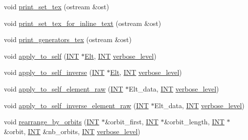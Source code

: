 \begin{DoxyCompactItemize}
void \mbox{\hyperlink{classset__and__stabilizer_a691a961365c213993a7f9f4b899457d9}{print\+\_\+set\+\_\+tex}} (ostream \&ost)
\item 
void \mbox{\hyperlink{classset__and__stabilizer_abded22948be28aa60b8ef9942d7b8198}{print\+\_\+set\+\_\+tex\+\_\+for\+\_\+inline\+\_\+text}} (ostream \&ost)
\item 
void \mbox{\hyperlink{classset__and__stabilizer_acbaae72aef6863f689fa377652cadb3e}{print\+\_\+generators\+\_\+tex}} (ostream \&ost)
\item 
void \mbox{\hyperlink{classset__and__stabilizer_a5d98982a4367ca2866d91da9ff48f095}{apply\+\_\+to\+\_\+self}} (\mbox{\hyperlink{galois_8h_a09fddde158a3a20bd2dcadb609de11dc}{I\+NT}} $\ast$\mbox{\hyperlink{simeon_8_c_aec1406935bdb1fee3561fcb840964100}{Elt}}, \mbox{\hyperlink{galois_8h_a09fddde158a3a20bd2dcadb609de11dc}{I\+NT}} \mbox{\hyperlink{simeon_8_c_a818073fbcc2f439e7c56952f67386122}{verbose\+\_\+level}})
\item 
void \mbox{\hyperlink{classset__and__stabilizer_a6e18b805c0f6dfe0c8dd9762411d9e41}{apply\+\_\+to\+\_\+self\+\_\+inverse}} (\mbox{\hyperlink{galois_8h_a09fddde158a3a20bd2dcadb609de11dc}{I\+NT}} $\ast$\mbox{\hyperlink{simeon_8_c_aec1406935bdb1fee3561fcb840964100}{Elt}}, \mbox{\hyperlink{galois_8h_a09fddde158a3a20bd2dcadb609de11dc}{I\+NT}} \mbox{\hyperlink{simeon_8_c_a818073fbcc2f439e7c56952f67386122}{verbose\+\_\+level}})
\item 
void \mbox{\hyperlink{classset__and__stabilizer_aa7730cf2de0ea01c59c1fe9e3beeb550}{apply\+\_\+to\+\_\+self\+\_\+element\+\_\+raw}} (\mbox{\hyperlink{galois_8h_a09fddde158a3a20bd2dcadb609de11dc}{I\+NT}} $\ast$Elt\+\_\+data, \mbox{\hyperlink{galois_8h_a09fddde158a3a20bd2dcadb609de11dc}{I\+NT}} \mbox{\hyperlink{simeon_8_c_a818073fbcc2f439e7c56952f67386122}{verbose\+\_\+level}})
\item 
void \mbox{\hyperlink{classset__and__stabilizer_aefacb2c9fef9d9ae8224b38185e4eeda}{apply\+\_\+to\+\_\+self\+\_\+inverse\+\_\+element\+\_\+raw}} (\mbox{\hyperlink{galois_8h_a09fddde158a3a20bd2dcadb609de11dc}{I\+NT}} $\ast$Elt\+\_\+data, \mbox{\hyperlink{galois_8h_a09fddde158a3a20bd2dcadb609de11dc}{I\+NT}} \mbox{\hyperlink{simeon_8_c_a818073fbcc2f439e7c56952f67386122}{verbose\+\_\+level}})
\item 
void \mbox{\hyperlink{classset__and__stabilizer_acfc35aa1163712215848fab02017b28d}{rearrange\+\_\+by\+\_\+orbits}} (\mbox{\hyperlink{galois_8h_a09fddde158a3a20bd2dcadb609de11dc}{I\+NT}} $\ast$\&orbit\+\_\+first, \mbox{\hyperlink{galois_8h_a09fddde158a3a20bd2dcadb609de11dc}{I\+NT}} $\ast$\&orbit\+\_\+length, \mbox{\hyperlink{galois_8h_a09fddde158a3a20bd2dcadb609de11dc}{I\+NT}} $\ast$\&orbit, \mbox{\hyperlink{galois_8h_a09fddde158a3a20bd2dcadb609de11dc}{I\+NT}} \&nb\+\_\+orbits, \mbox{\hyperlink{galois_8h_a09fddde158a3a20bd2dcadb609de11dc}{I\+NT}} \mbox{\hyperlink{simeon_8_c_a818073fbcc2f439e7c56952f67386122}{verbose\+\_\+level}})

\end{DoxyCompactItemize}
